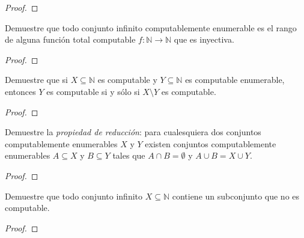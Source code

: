 \documentclass[12pt]{report}
\newcounter{it}
\theoremstyle{largebreak}
\newcommand\cf[3]{\ensuremath{#1:#2\rightarrow#3}}
\begin{document}
    \begin{proof}
        
    \end{proof}

    \begin{excer}
        Demuestre que todo conjunto infinito computablemente enumerable es el rango de alguna función total computable $\cf{f}{\mathbb{N}}{\mathbb{N}}$ que es inyectiva.
    \end{excer}

    \begin{proof}
        
    \end{proof}
        
    \begin{excer}
        Demuestre que si $X\subseteq\mathbb{N}$ es computable y $Y\subseteq\mathbb{N}$ es computable enumerable, entonces $Y$ es computable si y sólo si $X\setminus Y$ es computable.
    \end{excer}

    \begin{proof}
        
    \end{proof}

    \begin{excer}
        Demuestre la \textit{propiedad de reducción}: para cualesquiera dos conjuntos computablemente enumerables $X$ y $Y$ existen conjuntos computablemente enumerables $A\subseteq X$ y $B\subseteq Y$ tales que $A\cap B=\emptyset$ y $A\cup B=X\cup Y$. 
    \end{excer}

    \begin{proof}
        
    \end{proof}

    \begin{excer}
        Demuestre que todo conjunto infinito $X\subseteq\mathbb{N}$ contiene un subconjunto que no es computable.
    \end{excer}
    
    \begin{proof}
        
    \end{proof}
\end{document}
